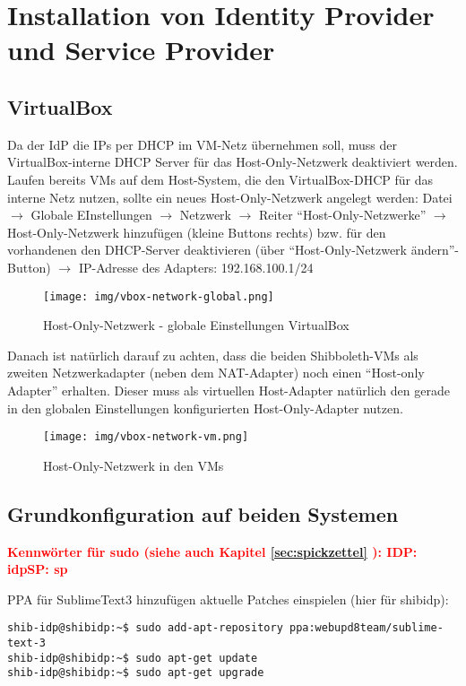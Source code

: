 \section{Installation von Identity Provider und Service Provider}
\subsection{VirtualBox}
Da der IdP die IPs per DHCP im VM-Netz übernehmen soll, muss der
VirtualBox-interne DHCP Server für das Host-Only-Netzwerk deaktiviert werden.
Laufen bereits VMs auf dem Host-System, die den VirtualBox-DHCP für das interne
Netz nutzen, sollte ein neues Host-Only-Netzwerk angelegt werden:\newline
Datei $\rightarrow$ Globale EInstellungen $\rightarrow$ Netzwerk $\rightarrow$
Reiter "`Host-Only-Netzwerke"' $\rightarrow$ Host-Only-Netzwerk hinzufügen
(kleine Buttons rechts) bzw. für den vorhandenen den DHCP-Server deaktivieren
(über "`Host-Only-Netzwerk ändern"'-Button) $\rightarrow$ IP-Adresse des
Adapters: 192.168.100.1/24
\begin{figure}[h!]
  \centering
    \texttt{[image: img/vbox-network-global.png]}
    \caption{Host-Only-Netzwerk - globale Einstellungen VirtualBox}
\end{figure}

Danach ist natürlich darauf zu achten, dass die beiden Shibboleth-VMs als
zweiten Netzwerkadapter (neben dem NAT-Adapter) noch einen "`Host-only Adapter"'
erhalten. Dieser muss als virtuellen Host-Adapter natürlich den gerade in den
globalen Einstellungen konfigurierten Host-Only-Adapter nutzen.
\begin{figure}[h!]
  \centering
    \texttt{[image: img/vbox-network-vm.png]}
    \caption{Host-Only-Netzwerk in den VMs}
\end{figure}

\newpage
\subsection{Grundkonfiguration auf beiden Systemen}
\textcolor{red}{\textbf{Kennwörter für sudo (siehe auch Kapitel
\ref{sec:spickzettel} ):
\newline IDP: idp\newline SP: sp}}

PPA für SublimeText3 hinzufügen aktuelle Patches einspielen (hier für shibidp):
\begin{lstlisting}
shib-idp@shibidp:~$ sudo add-apt-repository ppa:webupd8team/sublime-text-3
shib-idp@shibidp:~$ sudo apt-get update
shib-idp@shibidp:~$ sudo apt-get upgrade
\end{lstlisting}

